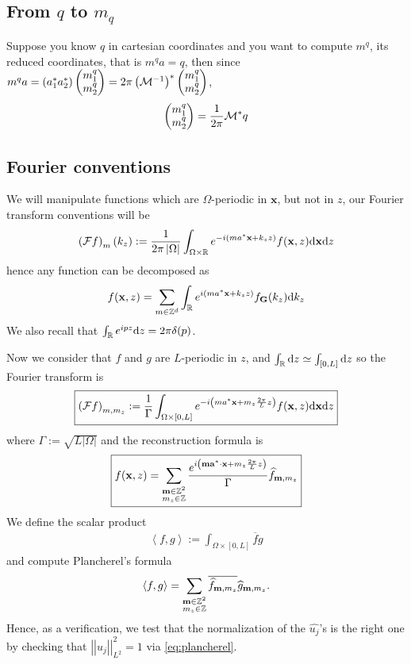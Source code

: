 \documentclass[11pt,a4paper,reqno,french,tikz]{amsart}
\def\d{{\rm d}}
\newcommand{\pa}[1]{\left( #1 \right)} %
\newcommand{\ab}[1]{\left|#1\right|} %
\newcommand{\ps}[1]{\left< #1 \right>} %
\newcommand{\nor}[2]{ \left| \! \left| #1 \right| \! \right|_{#2} } %
\newcommand{\f}[2]{\frac{#1}{#2}} %
\newcommand{\mat}[1]{\begin{pmatrix} #1 \end{pmatrix}} %
\def\bG{{\mathbf G}}
\def\ba{{\mathbf a}}
\def\bx{{\mathbf x}}
\def\bmm{{\mathbf m}}
\begin{document}
\subsection{From $q$ to $m_q$}%
\label{sub:from_q_to_m_q_}

Suppose you know $q$ in cartesian coordinates and you want to compute $m^q$, its reduced coordinates, that is $m^q a = q$, then since $m^q a = \pa{a_1^* a_2^*} \mat{m^q_1 \\ m^q_2} = 2\pi \pa{\cM^{-1}}^* \mat{m^q_1 \\ m^q_2}$,
\begin{align}\label{eq:inv_q}
\mat{m^q_1 \\ m^q_2} = \f{1}{2\pi} \cM^* q
\end{align}

\subsection{Fourier conventions}%
\label{sub:fourier_conventions}

We will manipulate functions which are $\Omega$-periodic in $\bx$, but not in $z$, our Fourier transform conventions will be
\begin{align*}
	\pa{\cF f}_m(k_z) := \f{1}{2\pi \ab{\Omega}} \int_{\Omega\times\R} e^{-i\pa{ma^* \bx + k_z z}} f(\bx,z) \d \bx \d z
\end{align*}
hence any function can be decomposed as
\begin{align*}
f(\bx,z) = \sum_{m \in \Z^d} \int_\R e^{i\pa{ma^* \bx + k_z z}} f_\bG(k_z) \d k_z
\end{align*}
We also recall that $\int_\R e^{ipz} \d z = 2\pi \delta(p)$.


Now we consider that $f$ and $g$ are $L$-periodic in $z$, and $\int_\R \d z \simeq \int_{[0,L]} \d z$ so the Fourier transform is
\begin{align*}
	\boxed{\pa{\cF f}_{m,m_z} := \f{1}{\Gamma} \int_{\Omega\times [0,L]} e^{-i\pa{ma^* \bx + m_z \f{2\pi}{L} z}} f(\bx,z) \d \bx \d z}
\end{align*}
where $\Gamma := \sqrt{L\ab{\Omega}}$
and the reconstruction formula is
\begin{align}\label{eq:dec_four}
\boxed{f(\bx,z) =  \sum_{\substack{\bmm \in \Z^2 \\ m_z \in \Z}}  \f{e^{i\pa{\bmm \ba^* \cdot \bx + m_z \f{2\pi}L z}}}{\Gamma} \widehat{f}_{\bmm,m_z}}
\end{align}
We define the scalar product
\begin{align*}
\ps{f,g} := \int_{\Omega\times [0,L]} \overline{f}g
\end{align*}
and compute Plancherel's formula
\begin{align}\label{eq:plancherel}
\ps{f,g} = \sum_{\substack{\bmm \in \Z^2 \\ m_z \in \Z}} \overline{\widehat{f}_{\bmm,m_z}} \widehat{g}_{\bmm,m_z}.
\end{align}
Hence, as a verification, we test that the normalization of the $\widehat{u_j}$'s is the right one by checking that $\nor{u_j}{L^2}^2 = 1$ via \eqref{eq:plancherel}.
\end{document}
